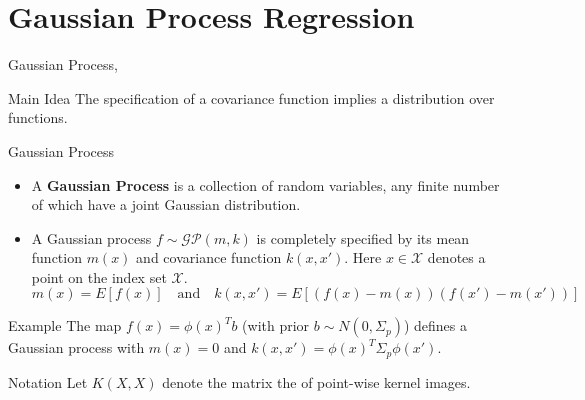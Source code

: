 \documentclass[10pt]{beamer}
\begin{document}
\section{Gaussian Process Regression}


\begin{frame}{Gaussian Process}{\cite[Chapter 21]{BDA13}, \cite[Chapter 2.2]{RW05}}
\begin{block}{Main Idea}
The specification of a covariance function implies a distribution over functions.
\end{block}
\begin{block}{Gaussian Process}
\begin{itemize}
\item A {\bf Gaussian Process} is a collection of random variables, any finite number of which have a joint Gaussian distribution. \\
\item A Gaussian process $f \sim \mathcal{GP}(m, k)$ is completely specified by its mean function $m(x)$ and covariance function $k(x, x')$. Here $x \in \mathcal{X}$ denotes a point on the index set $\mathcal{X}$.
$$
m(x) = E[f(x)]
\quad
\text{and}
\quad
k(x, x') = E[(f(x) - m(x))(f(x') - m(x'))]
$$
\end{itemize}
\end{block}
\pause 
\begin{block}{Example}
The map $f(x) = \phi(x)^T b $ (with prior $b\sim N(0, \Sigma_p)$) defines a Gaussian process with $m(x)=0$ and $k(x, x') = \phi(x)^T\Sigma_p\phi(x')$.
\end{block}
\begin{block}{Notation}
Let $K(X, X)$ denote the matrix the of point-wise kernel images. 
\end{block}
\end{frame}
\end{document}
